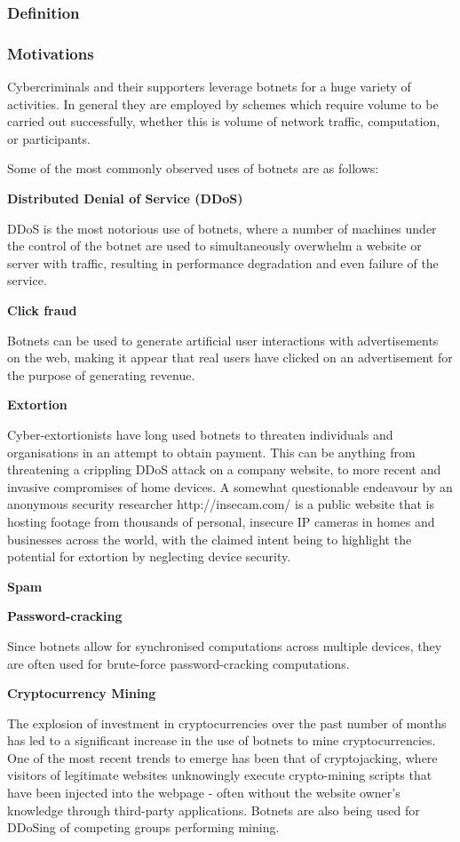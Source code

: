 \subsubsection{Definition}
\subsubsection{Motivations}
Cybercriminals and their supporters leverage botnets for a huge variety of activities. In general they are employed by schemes which require volume to be carried out successfully, whether this is volume of network traffic, computation, or participants.

Some of the most commonly observed uses of botnets are as follows:

\bullet \textbf{Distributed Denial of Service (DDoS)}

DDoS is the most notorious use of botnets, where a number of machines under the control of the botnet are used to simultaneously overwhelm a website or server with traffic, resulting in performance degradation and even failure of the service.

\bullet \textbf{Click fraud}

Botnets can be used to generate artificial user interactions with advertisements on the web, making it appear that real users have clicked on an advertisement for the purpose of generating revenue.

\bullet \textbf{Extortion}

Cyber-extortionists have long used botnets to threaten individuals and organisations in an attempt to obtain payment. This can be anything from threatening a crippling DDoS attack on a company website, to more recent and invasive compromises of home devices. A somewhat questionable endeavour by an anonymous security researcher {http://insecam.com/} is a public website that is hosting footage from thousands of personal, insecure IP cameras in homes and businesses across the world, with the claimed intent being to highlight the potential for extortion by neglecting device security.

\bullet \textbf{Spam}

\bullet \textbf{Password-cracking}

Since botnets allow for synchronised computations across multiple devices, they are often used for brute-force password-cracking computations.

\bullet \textbf{Cryptocurrency Mining}

The explosion of investment in cryptocurrencies over the past number of months has led to a significant increase in the use of botnets to mine cryptocurrencies. One of the most recent trends to emerge has been that of cryptojacking, where visitors of legitimate websites unknowingly execute crypto-mining scripts that have been injected into the webpage - often without the website owner's knowledge through third-party applications. Botnets are also being used for DDoSing of competing groups performing mining.

